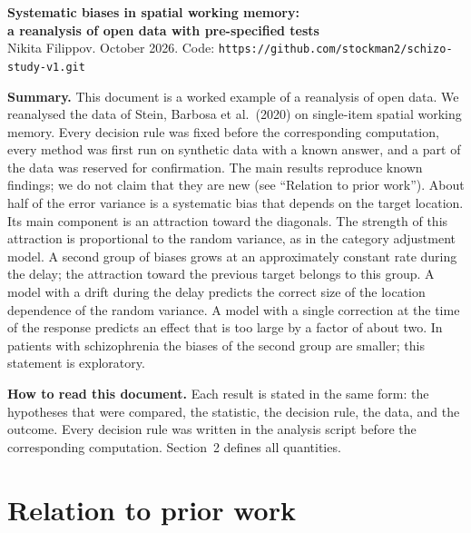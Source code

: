 \documentclass[10pt,a4paper]{article}
\begin{document}
\begin{center}
{\Large\bfseries Systematic biases in spatial working memory:\\[2pt] a reanalysis of open data with pre-specified tests}\\[6pt]
{\small Nikita Filippov. October 2026. Code: \texttt{https://github.com/stockman2/schizo-study-v1.git}}
\end{center}

\textbf{Summary.} This document is a worked example of a reanalysis of open data. We reanalysed the data
of Stein, Barbosa et al.\ (2020) on single-item spatial working memory. Every decision rule was fixed before the
corresponding computation, every method was first run on synthetic data with a known answer, and a part of the
data was reserved for confirmation. The main results reproduce known findings; we do not claim that they are
new (see ``Relation to prior work''). About half of the error variance is a systematic bias that depends on
the target location. Its main component is an attraction toward the diagonals. The strength of this attraction
is proportional to the random variance, as in the category adjustment model. A second group of biases grows
at an approximately constant rate during the delay; the attraction toward the previous target belongs to this
group. A model with a drift during the delay predicts the correct size of the location dependence of the
random variance. A model with a single correction at the time of the response predicts an effect that is too
large by a factor of about two. In patients with schizophrenia the biases of the second group are smaller;
this statement is exploratory.

\textbf{How to read this document.} Each result is stated in the same form: the hypotheses that were
compared, the statistic, the decision rule, the data, and the outcome. Every decision rule was written in the
analysis script before the corresponding computation. Section~2 defines all quantities.

\section*{Relation to prior work}
\end{document}
